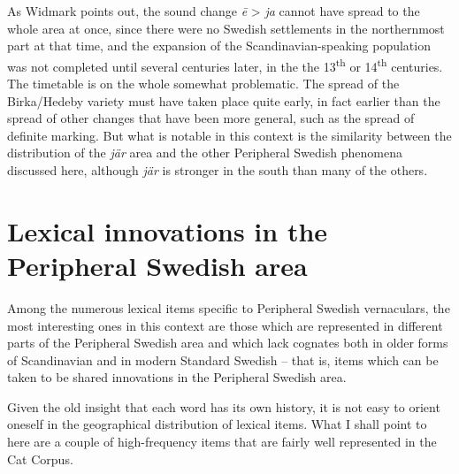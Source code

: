 \begin{stylecaption}
As Widmark points out, the sound change \textit{\=e }{\textgreater} \textit{ja }cannot have spread to the whole area at once, since there were no Swedish settlements in the northernmost part at that time, and the expansion of the Scandinavian-speaking population was not completed until several centuries later, in the the 13\textsuperscript{th} or 14\textsuperscript{th} centuries. The timetable is on the whole somewhat problematic. The spread of the Birka/Hedeby variety must have taken place quite early, in fact earlier than the spread of other changes that have been more general, such as the spread of definite marking. But what is notable in this context is the similarity between the distribution of the \textit{jär }area and the other Peripheral Swedish phenomena discussed here, although \textit{jär} is stronger in the south than many of the others. 

\end{stylecaption}

\begin{figure}[h]

\begin{minipage}{5.8752in}

\end{minipage}

\end{figure}
\section{Lexical innovations in the Peripheral Swedish area}

\begin{styleBodytextC}
Among the numerous lexical items specific to Peripheral Swedish vernaculars, the most interesting ones in this context are those which are represented in different parts of the Peripheral Swedish area and which lack cognates both in older forms of Scandinavian and in modern Standard Swedish – that is, items which can be taken to be shared innovations in the Peripheral Swedish area. 

\end{styleBodytextC}

\begin{styleBodytextC}
Given the old insight that each word has its own history, it is not easy to orient oneself in the geographical distribution of lexical items. What I shall point to here are a couple of high-frequency items that are fairly well represented in the Cat Corpus.

\end{styleBodytextC}

